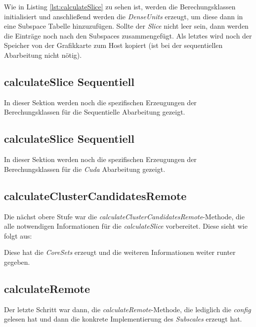

Wie in Listing \ref{lst:calculateSlice} zu sehen ist, werden die Berechungsklassen initialisiert und anschließend werden die 
\emph{DenseUnits} erzeugt, um diese dann in eine Subspace Tabelle hinzuzufügen. Sollte der \emph{Slice} nicht leer sein, dann 
werden die Einträge noch nach den Subspaces zusammengefügt. Als letztes wird noch der Speicher von der Grafikkarte zum Host kopiert 
(ist bei der sequentiellen Abarbeitung nicht nötig). 

\subsection{calculateSlice Sequentiell}
In dieser Sektion werden noch die spezifischen Erzeugungen der Berechungsklassen für die Sequentielle Abarbeitung gezeigt.



\subsection{calculateSlice Sequentiell}
In dieser Sektion werden noch die spezifischen Erzeugungen der Berechungsklassen für die \emph{Cuda} Abarbeitung gezeigt.



\subsection{calculateClusterCandidatesRemote}
Die nächst obere Stufe war die \emph{calculateClusterCandidatesRemote}-Methode, die alle notwendigen 
Informationen für die \emph{calculateSlice} vorbereitet. Diese sieht wie folgt aus:



Diese hat die \emph{CoreSets} erzeugt und die weiteren Informationen weiter runter gegeben.

\subsection{calculateRemote}
Der letzte Schritt war dann, die \emph{calculateRemote}-Methode, die lediglich die \emph{config}
gelesen hat und dann die konkrete Implementierung des \emph{Subscales} erzeugt hat. 

